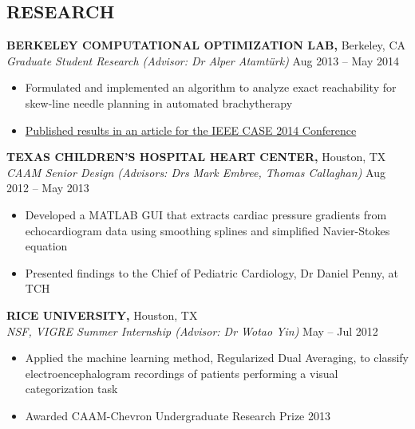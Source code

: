 \documentclass[geomargin]{res}
\begin{document}
\begin{resume}
\section{RESEARCH}
{\bf BERKELEY COMPUTATIONAL OPTIMIZATION LAB,} Berkeley, CA \\
{\em Graduate Student Research (Advisor: Dr Alper Atamt\"urk)} \hfill
Aug 2013 -- May 2014 \\                                          \vspace{-4mm}
\begin{itemize}                                         \itemsep1pt %
        \item    Formulated and implemented an algorithm to analyze exact reachability for skew-line needle planning in automated brachytherapy
        \item    \href{http://www.decf.berkeley.edu/~gyang/paper2014.pdf}{Published results in an article for the IEEE CASE 2014 Conference}
\end{itemize}
\vspace{-2mm}

{\bf TEXAS CHILDREN'S HOSPITAL HEART CENTER,} Houston, TX \\
{\em CAAM Senior Design (Advisors: Drs Mark Embree, Thomas Callaghan)} \hfill
Aug 2012 -- May 2013 \\                                          \vspace{-4mm}
\begin{itemize}                                         \itemsep1pt %
        \item  Developed a MATLAB GUI that extracts cardiac pressure gradients from echocardiogram data using smoothing splines and simplified Navier-Stokes equation 
        \item  Presented findings to the Chief of Pediatric Cardiology, Dr Daniel Penny, at TCH
\end{itemize}
\vspace{-2mm}

{\bf RICE UNIVERSITY,} Houston, TX \\
{\em NSF, VIGRE Summer Internship (Advisor: Dr Wotao Yin)}    \hfill
May -- Jul 2012 \\                                          \vspace{-4mm}
\begin{itemize}                                         \itemsep1pt 
        \item  Applied the machine learning method, Regularized Dual Averaging, to classify electroencephalogram  recordings of patients performing a visual categorization task
        \item Awarded CAAM-Chevron Undergraduate Research Prize
2013\end{itemize}
\vspace{-2mm}


\end{resume}
\end{document}
